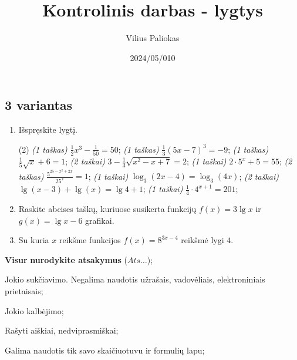 \documentclass[a4paper]{article}
\title{Kontrolinis darbas - lygtys}
\author{Vilius Paliokas}
\date{2024/05/010}
\begin{document}
\thispagestyle{fancy}

\titlespacing*{\subsection}{0pt}{.75ex}{0.75ex}

\subsection*{3 variantas}

\begin{enumerate}
      \item Išspręskite lygtį.
            \begin{tasks}[item-format={\normalfont}, after-item-skip=2mm](2)
                  \task \textit{(1 taškas)} $\frac{1}{2}x^3-\frac{1}{50}=50$;
                  \task \textit{(1 taškas)} $\frac{1}{3}(5x-7)^3=-9$;
                  \task \textit{(1 taškas)} $\frac{1}{5}\sqrt{x}+6=1$;
                  \task \textit{(2 taškai)} $3-\frac{1}{3}\sqrt{x^2-x+7}=2$;
                  \task \textit{(1 taškai)} $2\cdot5^x+5=55$;
                  \task \textit{(2 taškas)} $\frac{5^{25-x^2+2x}}{25^x}=1$;
                  \task \textit{(1 taškai)} $\log_3(2x-4)=\log_3(4x)$;
                  \task \textit{(2 taškai)} $\lg(x-3)+\lg(x)=\lg4+1$;
                  \task \textit{(1 taškai)} $\frac{1}{4}\cdot 4^{x+1}=201$;
            \end{tasks}

      \item Raskite abcises taškų, kuriuose susikerta funkcijų $f(x)=3\lg{x}$ ir $g(x)=\lg{x}-6$ grafikai.
      \item Su kuria $x$ reikšme funkcijos $f(x)=8^{3x-4}$ reikšmė lygi $4$.
\end{enumerate}

\begin{small}
      \begin{enumerate*}[label={(\arabic*)}]
            \item \textbf{Visur} \textbf{nurodykite atsakymus} ($Ats\ldots$);
            \item Jokio sukčiavimo. Negalima naudotis užrašais, vadovėliais,
            elektroniniais prietaisais;
            \item Jokio kalbėjimo;
            \item Rašyti aiškiai, nedviprasmiškai;
            \item Galima naudotis tik savo skaičiuotuvu ir formulių lapu;
      \end{enumerate*}
\end{small}
\end{document}
